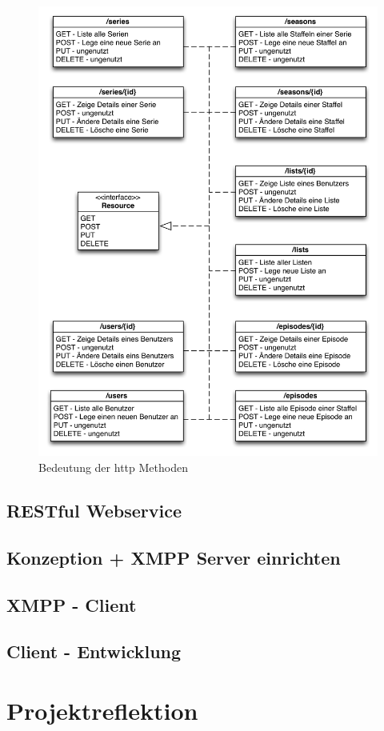 \documentclass[a4paper]{article}
\begin{document}
\begin{figure}[H]
\includegraphics[width=1\textwidth]{images/bedeutunghttpmethoden.png}
\caption{Bedeutung der http Methoden}
\label{bedeutunghttpmethoden}
\end{figure}

\newpage


\subsection{RESTful Webservice}

\newpage

\subsection{Konzeption + XMPP Server einrichten}

\newpage

\subsection{XMPP - Client}

\newpage

\subsection{Client - Entwicklung}

\newpage

\section{Projektreflektion}

\newpage

\listoffigures

\newpage

\listoftables
\end{document}
